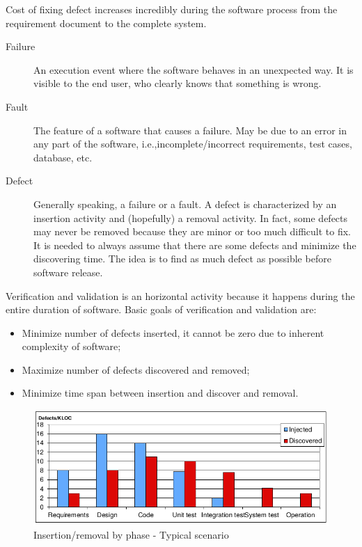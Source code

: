 Cost of fixing defect increases incredibly during the software process from the requirement document to the complete system.

\begin{description}
\item [Failure] An execution event where the software behaves in an unexpected way. It is visible to the end user, who clearly knows that something is wrong.
\item [Fault] The feature of a software that causes a failure. May be due to an error in any part of the software, i.e.,\@ incomplete/incorrect requirements, test cases, database, etc.
\item [Defect] Generally speaking, a failure or a fault. A defect is characterized by an insertion activity and (hopefully) a removal activity. In fact, some defects may never be removed because they are minor or too much difficult to fix. It is needed to always assume that there are some defects and minimize the discovering time. The idea is to find as much defect as possible before software release.
\end{description}

Verification and validation is an horizontal activity because it happens during the entire duration of software. Basic goals of verification and validation are:
\begin{itemize}
\item Minimize number of defects inserted, it cannot be zero due to inherent complexity of software;
\item Maximize number of defects discovered and removed;
\item Minimize time span between insertion and discover and removal.
\end{itemize}

\begin{figure}[hbtp]
\centering
\includegraphics[scale=0.4]{images/defects_insertion_removal.png}
\caption{Insertion/removal by phase - Typical scenario}
\end{figure}

